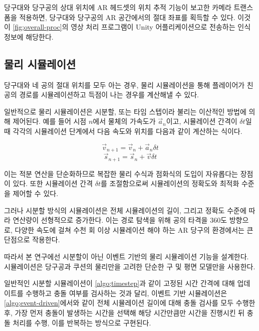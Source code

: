 \documentclass[10pt]{oblivoir}
\begin{document}
당구대와 당구공의 상대 위치에 AR 헤드셋의 위치 추적 기능이 보고한 카메라 트랜스폼을 적용하면, 당구대와 당구공의 AR 공간에서의 절대 좌표를 획득할 수 있다. 이것이 \cref{fig;overall-proc}의 영상 처리 프로그램이 Unity 어플리케이션으로 전송하는 인식 정보에 해당한다.

\subsection{물리 시뮬레이션}
당구대와 네 공의 절대 위치를 모두 아는 경우, 물리 시뮬레이션을 통해 플레이어가 친 공의 경로를 시뮬레이션하고 득점이 나는 경우를 계산해낼 수 있다.

일반적으로 물리 시뮬레이션은 시분할, 또는 타임 스텝이라 불리는 이산적인 방법에 의해 제어된다. 예를 들어 시점 $n$에서 물체의 가속도가 $\vec{a}_n$이고, 시뮬레이션 간격이 $\delta{t}$일 때 각각의 시뮬레이션 단계에서 다음 속도와 위치를 다음과 같이 계산하는 식이다.

$$ \vec{v}_{n+1} = \vec{v}_n + \vec{a}_n\delta{t} $$
$$ \vec{s}_{n+1} = \vec{s}_n + \vec{v}\delta{t} $$

이는 적분 연산을 단순화하므로 복잡한 물리 수식과 점화식의 도입이 자유롭다는 장점이 있다. 또한 시뮬레이션 간격 $\delta{t}$를 조절함으로써 시뮬레이션의 정확도와 최적화 수준을 제어할 수 있다.

그러나 시분할 방식의 시뮬레이션은 전체 시뮬레이션의 길이, 그리고 정확도 수준에 따라 연산량이 선형적으로 증가한다. 이는 경로 탐색을 위해 공의 타격을 360도 방향으로, 다양한 속도에 걸쳐 수천 회 이상 시뮬레이션 해야 하는 AR 당구의 환경에서는 큰 단점으로 작용한다. 

따라서 본 연구에선 시분할이 아닌 이벤트 기반의 물리 시뮬레이션 기능을 설계한다. 시뮬레이션은 당구공과 쿠션의 물리만을 고려한 단순한 구 및 평면 모델만을 사용한다. 

일반적인 시분할 시뮬레이션이 \cref{algo;timestep}과 같이 고정된 시간 간격에 대해 업데이트를 수행하고 충돌 여부를 검사하는 것과 달리, 이벤트 기반 시뮬레이션은 \cref{algo;event-driven}에서와 같이 전체 시뮬레이션 길이에 대해 충돌 검사를 모두 수행한 후, 가장 먼저 충돌이 발생하는 시간을 선택해 해당 시간만큼만 시간을 진행시킨 뒤 충돌 처리를 수행, 이를 반복하는 방식으로 구현된다.
\end{document}
